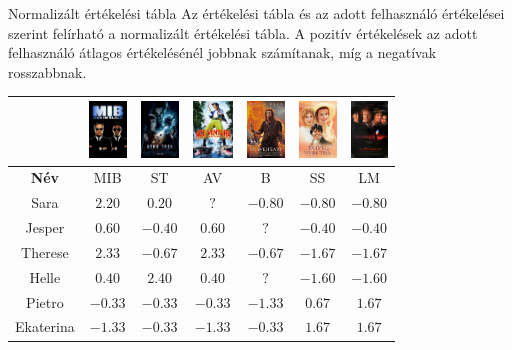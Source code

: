 \documentclass[english, aspectratio=169]{beamer}
\begin{document}
\begin{frame}{Normalizált értékelési tábla}
Az értékelési tábla és az adott felhasználó értékelései szerint felírható a normalizált értékelési tábla. A pozitív értékelések az adott felhasználó átlagos értékelésénél jobbnak számítanak, míg a negatívak rosszabbnak. 
\begin{center}
\begin{tabular}{|c|c|c|c|c|c|c|}
\hline
& 
\includegraphics[height=1.5cm, keepaspectratio]{images/movies/men_in_black.png} &
\includegraphics[height=1.5cm, keepaspectratio]{images/movies/star_trek.png} &
\includegraphics[height=1.5cm, keepaspectratio]{images/movies/ace_ventura.png} &
\includegraphics[height=1.5cm, keepaspectratio]{images/movies/braveheart.png} &
\includegraphics[height=1.5cm, keepaspectratio]{images/movies/sense_and_sensibility.png} &
\includegraphics[height=1.5cm, keepaspectratio]{images/movies/les_miserables.png} \\
\hline
\textbf{Név} & MIB & ST & AV & B & SS & LM\\ 
\hline
Sara & $2.20$ & $0.20$ & $?$ & $-0.80$ & $-0.80$ & $-0.80$ \\
\hline
Jesper & $0.60$ & $-0.40$ & $0.60$ & $?$ & $-0.40$ & $-0.40$ \\
\hline
Therese & $2.33$ & $-0.67$ & $2.33$ & $-0.67$ & $-1.67$ & $-1.67$ \\
\hline
Helle & $0.40$ & $2.40$ & $0.40$ & $?$ & $-1.60$ & $-1.60$ \\
\hline
Pietro & $-0.33$ & $-0.33$ & $-0.33$ & $-1.33$ & $0.67$ & $1.67$ \\
\hline
Ekaterina & $-1.33$ & $-0.33$ & $-1.33$ & $-0.33$ & $1.67$ & $1.67$ \\
\hline
\end{tabular}
\end{center}
\end{frame}
\end{document}
